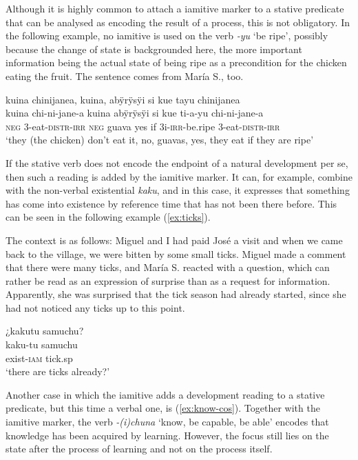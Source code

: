 Although it is highly common to attach a iamitive marker to a stative predicate that can be analysed as encoding the result of a process, this is not obligatory. In the following example, no iamitive is used on the verb \textit{-yu} ‘be ripe’, possibly because the change of state is backgrounded here, the more important information being the actual state of being ripe as a precondition for the chicken eating the fruit. %
The sentence comes from María S., too.

\ea\label{ex:nat-proc-no-tu}
\begingl 
\glpreamble kuina chinijanea, kuina, abÿrÿsÿi si kue tayu chinijanea\\
\gla kuina chi-ni-jane-a kuina abÿrÿsÿi si kue ti-a-yu chi-ni-jane-a\\ 
\glb \textsc{neg} 3-eat-\textsc{distr}-\textsc{irr} \textsc{neg} guava yes if 3i-\textsc{irr}-be.ripe 3-eat-\textsc{distr}-\textsc{irr}\\ 
\glft ‘they (the chicken) don’t eat it, no, guavas, yes, they eat if they are ripe’
\trailingcitation{[rxx-e121126s-3.36]}
\xe

If the stative verb does not encode the endpoint of a natural development per se, then such a reading is added by the iamitive marker.  It can, for example, combine with the non-verbal existential  \textit{kaku}, and in this case, it expresses that something has come into existence by reference time that has not been there before. This can be seen in the following example (\ref{ex:ticks}).

The context is as follows: Miguel and I had paid José a visit and when we came back to the village, we were bitten by some small ticks. Miguel made a comment that there were many ticks, and María S. reacted with a question, which can rather be read as an expression of surprise than as a request for information. Apparently, she was surprised that the tick season had already started, since she had not noticed any ticks up to this point.

\ea\label{ex:ticks}
\begingl 
\glpreamble ¿kakutu samuchu?\\
\gla kaku-tu samuchu\\ 
\glb exist-\textsc{iam} tick.sp\\ 
\glft ‘there are ticks already?’
\trailingcitation{[mrx-c120509l.149]}
\xe

Another case in which the iamitive adds a development reading to a stative predicate, but this time a verbal one, is (\ref{ex:know-cos}). Together with the iamitive marker, the verb \textit{-(i)chuna} ‘know, be capable, be able’ encodes that knowledge has been acquired by learning. However, the focus still lies on the state after the process of learning and not on the process itself.

